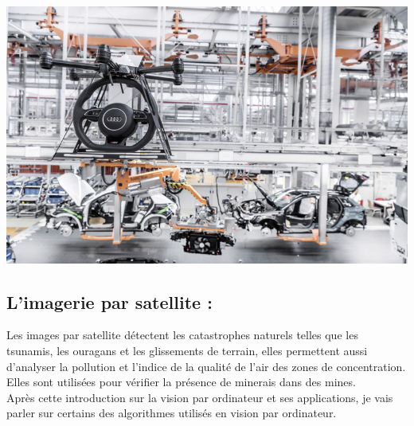 \begin{center}
    \includegraphics[scale=0.25]{img7.png}
    \label{fig4}
\end{center} 

\subsection{L’imagerie par satellite :}
Les images par satellite détectent les catastrophes naturels telles que les tsunamis, les ouragans et les glissements de terrain, elles permettent aussi d’analyser la pollution et l’indice de la qualité de l’air des zones de concentration. Elles sont utilisées pour vérifier la présence de minerais dans des mines.\\[2cm]

Après  cette introduction sur la vision par ordinateur et ses applications, je vais parler sur certains des algorithmes utilisés en vision par ordinateur.
